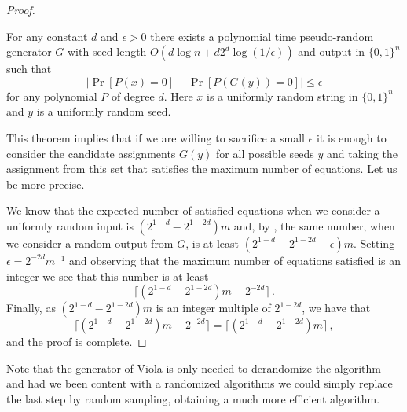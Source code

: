 \begin{proof}
\begin{theorem}\label{thm:viola}
For any constant $d$ and $\epsilon > 0$ there exists
a polynomial time pseudo-random generator $G$ with
seed length $O(d \log n + d 2^d \log (1/\epsilon))$
and output in $\{ 0,1\}^n$ such that
$$
|\Pr[P(x)=0]- \Pr[P(G(y))=0]| \leq \epsilon
$$
for any polynomial $P$ of degree $d$.  Here $x$ is 
a uniformly random string in $\{ 0,1\}^n$ and
$y$ is a uniformly random seed.
\end{theorem}

This theorem implies that if we are willing
to sacrifice a small $\epsilon$ it is enough
to consider the candidate assignments 
$G(y)$ for all possible seeds $y$ and taking the assignment
from this set that satisfies the %
maximum
number of equations.  Let us be more precise.

We know that the expected number of satisfied
equations when we consider a uniformly random
input is $(2^{1-d}- 2^{1-2d}) m$ and, by
, the same number, when
we consider a random output from $G$, is
at least $(2^{1-d}- 2^{1-2d}-\epsilon) m$.
Setting $\epsilon= 2^{-2d} m^{-1}$ and observing that
the maximum number of equations satisfied is
an integer we see that this number is at least
$$
\lceil (2^{1-d}- 2^{1-2d}) m-2^{-2d} \rceil \,.
$$
Finally, as $(2^{1-d}- 2^{1-2d}) m$ is an integer
multiple of $2^{1-2d}$, we have that
$$
\lceil (2^{1-d}- 2^{1-2d}) m-2^{-2d} \rceil 
=\lceil (2^{1-d}- 2^{1-2d}) m \rceil\,,
$$
and the proof is complete.
\end{proof}

Note that the generator of Viola is only needed to
derandomize the algorithm and had we been content
with a randomized algorithms we could simply replace
the last step by random sampling, obtaining a much
more efficient algorithm.
